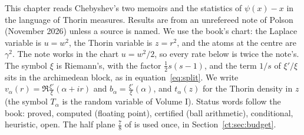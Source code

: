 \label{ct:ch:cheb}

This chapter reads Chebyshev's two memoirs and the statistics of $\psi(x)-x$ in the language of Thorin measures. Results are from an unrefereed note of Polson (November 2026) unless a source is named. We use the book's chart: the Laplace variable is $u=w^2$, the Thorin variable is $z=r^2$, and the atoms at the centre are $\gamma^2$. The note works in the chart $u=w^2/2$, so every rate below is twice the note's. The symbol $\xi$ is Riemann's, with the factor $\frac12s(s-1)$, and the term $1/s$ of $\xi'/\xi$ sits in the archimedean block, as in equation~\eqref{eq:split}. We write $v_\alpha(r)=\Re\frac{\xi'}{\xi}(\alpha+ir)$ and $b_\alpha=\frac{\xi'}{\xi}(\alpha)$, and $t_\alpha(z)$ for the Thorin density in $z$ (the symbol $T_\alpha$ is the random variable of Volume I). Status words follow the book: proved, computed (floating point), certified (ball arithmetic), conditional, heuristic, open. The half plane $\frac78$ of \cite{OAI26a} is used once, in Section~\ref{ct:sec:budget}.


